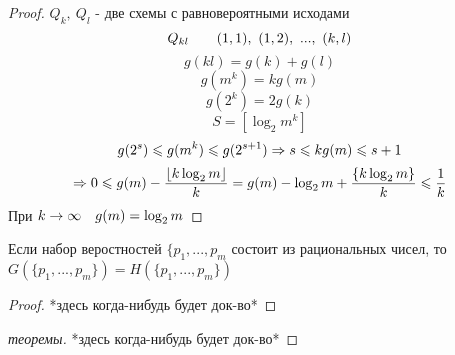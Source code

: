 \documentclass[discrete.tex]{subfiles}
\begin{document}
  \begin{proof}
    $Q_k,\ Q_l$ - две схемы с равновероятными исходами
    \[Q_{kl} \qquad (1,1),\ (1,2),\ ...,\ (k,l)\]
    \[g(kl) = g(k) + g(l)\]
    \[g(m^k) = k g(m)\]
    \[g(2^k) = 2 g(k)\]
    \[S = [\log_2 m^k]\]
    \[g(2^s) \leqslant g(m^k) \leqslant g(2^{s+1}) \Rightarrow s \leqslant k g(m) \leqslant s+1\]
    \[\Rightarrow 0 \leqslant g(m) - \frac{\lfloor k \log_2 m\rfloor}{k} = g(m) - \log_2 m + \frac{\{k \log_2 m\}}{k} \leqslant \frac{1}{k}\]
    При $k \rightarrow \infty \quad g(m) = \log_2 m$
  \end{proof}

  \begin{lemma_2}
    Если набор веростностей $\{p_1,...,p_m$ состоит из рациональных чисел, то $G(\{p_1,...,p_m\}) = H(\{p_1,...,p_m\})$
  \end{lemma_2}

  \begin{proof}
    *здесь когда-нибудь будет док-во*
  \end{proof}

  \begin{proof}[теоремы]
    *здесь когда-нибудь будет док-во*
  \end{proof}
\end{document}
